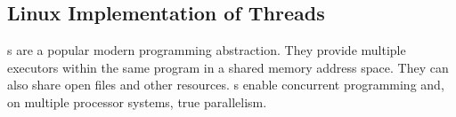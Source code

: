\subsection{Linux Implementation of Threads}\label{subsec:Linux_Implementation_Threads}
s are a popular modern programming abstraction.
They provide multiple executors within the same program in a shared memory address space.
They can also share open files and other resources.
s enable concurrent programming and, on multiple processor systems, true parallelism.


